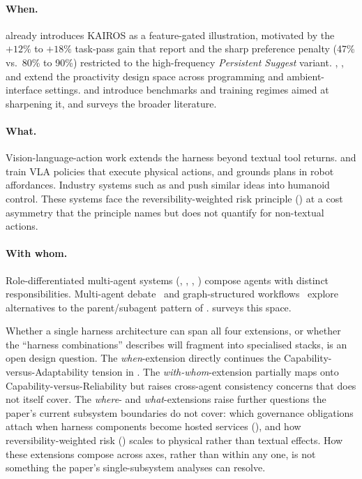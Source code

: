 \paragraph{When.}  already introduces KAIROS as a feature-gated illustration, motivated by the $+12\%$ to $+18\%$ task-pass gain that \citet{chi2025proactive} report and the sharp preference penalty (47\% vs.\ 80\% to 90\%) restricted to the high-frequency \emph{Persistent Suggest} variant. \citet{liu2025innerthoughts}, \citet{pu2025codellaborator}, and \citet{lee2025sensibleagent} extend the proactivity design space across programming and ambient-interface settings. \citet{pasternak2025probe} and \citet{sun2025userville} introduce benchmarks and training regimes aimed at sharpening it, and \citet{deng2025proactivesurvey} surveys the broader literature.

\paragraph{What.} Vision-language-action work extends the harness beyond textual tool returns. \citet{brohan2023rt2} and \citet{black2024pi0} train VLA policies that execute physical actions, and \citet{ahn2022saycan} grounds plans in robot affordances. Industry systems such as \citet{figure2025helix} and \citet{nvidia2025gr00t} push similar ideas into humanoid control. These systems face the reversibility-weighted risk principle () at a cost asymmetry that the principle names but does not quantify for non-textual actions.

\paragraph{With whom.} Role-differentiated multi-agent systems (\citet{hong2024metagpt}, \citet{li2023camel}, \citet{chen2024agentverse}, \citet{qian2024chatdev}) compose agents with distinct responsibilities. Multi-agent debate~\citep{du2023debate, liang2024divergent} and graph-structured workflows~\citep{zhuge2024gptswarm} explore alternatives to the parent/subagent pattern of . \citet{guo2024massurvey} surveys this space.


Whether a single harness architecture can span all four extensions, or whether the ``harness combinations'' \citet{anthropic2026harness} describes will fragment into specialised stacks, is an open design question. The \emph{when}-extension directly continues the Capability-versus-Adaptability tension in . The \emph{with-whom}-extension partially maps onto Capability-versus-Reliability but raises cross-agent consistency concerns that  does not itself cover. The \emph{where}- and \emph{what}-extensions raise further questions the paper's current subsystem boundaries do not cover: which governance obligations attach when harness components become hosted services (), and how reversibility-weighted risk () scales to physical rather than textual effects. How these extensions compose across axes, rather than within any one, is not something the paper's single-subsystem analyses can resolve.


